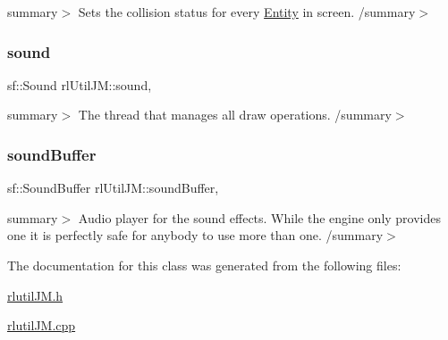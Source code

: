 summary$>$ Sets the collision status for every \hyperlink{class_entity}{Entity} in screen. /summary$>$ \mbox{\label{classrl_util_j_m_a9657abcb8f9ebba2f246e5ffc86c920d}} 
\subsubsection{\texorpdfstring{sound}{sound}}
{\footnotesize\ttfamily sf\+::\+Sound rl\+Util\+J\+M\+::sound\hspace{0.3cm}{\ttfamily [static]}, {\ttfamily [private]}}

summary$>$ The thread that manages all draw operations. /summary$>$ \mbox{\label{classrl_util_j_m_a624fabc30e3d76c5a32dadca5ea1186d}} 
\subsubsection{\texorpdfstring{sound\+Buffer}{soundBuffer}}
{\footnotesize\ttfamily sf\+::\+Sound\+Buffer rl\+Util\+J\+M\+::sound\+Buffer\hspace{0.3cm}{\ttfamily [static]}, {\ttfamily [private]}}

summary$>$ Audio player for the sound effects. While the engine only provides one it is perfectly safe for anybody to use more than one. /summary$>$ 

The documentation for this class was generated from the following files\+:\begin{DoxyCompactItemize}
\item 
\hyperlink{rlutil_j_m_8h}{rlutil\+J\+M.\+h}\item 
\hyperlink{rlutil_j_m_8cpp}{rlutil\+J\+M.\+cpp}\end{DoxyCompactItemize}
